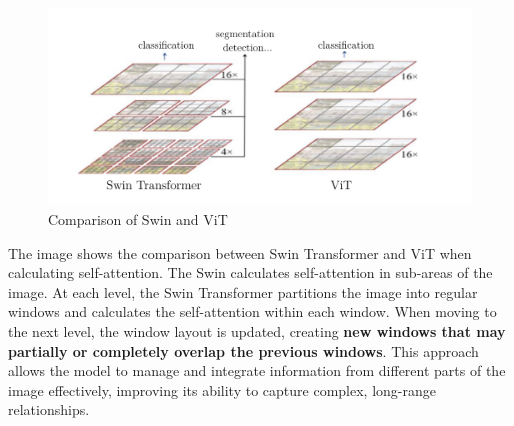 \begin{figure}[!htbp]
    \centering
    \includegraphics[width=0.85\linewidth]{tikz/chapter8 - Swin Transformer.pdf}
    \caption{Comparison of Swin and ViT}
\end{figure}

The image shows the comparison between Swin Transformer and ViT when calculating self-attention. The Swin calculates self-attention in sub-areas of the image. At each level, the Swin Transformer partitions the image into regular windows and calculates the self-attention within each window. When moving to the next level, the window layout is updated, creating \textbf{new windows that may partially or completely overlap the previous windows}. This approach allows the model to manage and integrate information from different parts of the image effectively, improving its ability to capture complex, long-range relationships.